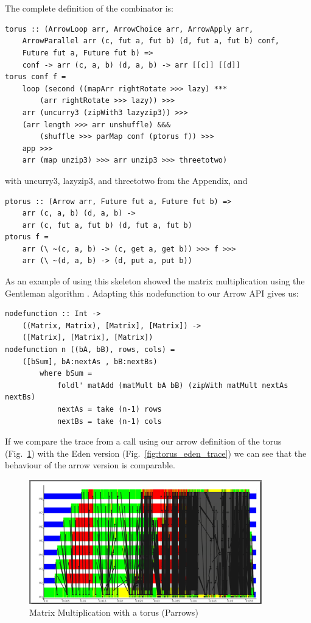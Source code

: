 \\\\
The complete definition of the  combinator is:
\begin{lstlisting}[frame=htrbl]
torus :: (ArrowLoop arr, ArrowChoice arr, ArrowApply arr,
	ArrowParallel arr (c, fut a, fut b) (d, fut a, fut b) conf,
	Future fut a, Future fut b) =>
	conf -> arr (c, a, b) (d, a, b) -> arr [[c]] [[d]]
torus conf f =
	loop (second ((mapArr rightRotate >>> lazy) ***
		(arr rightRotate >>> lazy)) >>>
	arr (uncurry3 (zipWith3 lazyzip3)) >>>
	(arr length >>> arr unshuffle) &&&
		(shuffle >>> parMap conf (ptorus f)) >>>
	app >>>
	arr (map unzip3) >>> arr unzip3 >>> threetotwo)
\end{lstlisting}
with uncurry3, lazyzip3, and threetotwo from the Appendix, and
\begin{lstlisting}[frame=htrbl]
ptorus :: (Arrow arr, Future fut a, Future fut b) =>
	arr (c, a, b) (d, a, b) ->
	arr (c, fut a, fut b) (d, fut a, fut b)
ptorus f =
	arr (\ ~(c, a, b) -> (c, get a, get b)) >>> f >>>
	arr (\ ~(d, a, b) -> (d, put a, put b))
\end{lstlisting}
As an example of using this skeleton \citet{eden_cefp} showed the matrix multiplication using the Gentleman algorithm \citep{Gentleman1978}. Adapting this nodefunction to our Arrow API gives us:
\begin{lstlisting}[frame=htrbl]
nodefunction :: Int ->
	((Matrix, Matrix), [Matrix], [Matrix]) ->
	([Matrix], [Matrix], [Matrix])
nodefunction n ((bA, bB), rows, cols) =
	([bSum], bA:nextAs , bB:nextBs)
		where bSum =
			foldl' matAdd (matMult bA bB) (zipWith matMult nextAs nextBs)
			nextAs = take (n-1) rows
			nextBs = take (n-1) cols
\end{lstlisting}
If we compare the trace from a call using our arrow definition of the torus (Fig.~\ref{fig:torus_parrows_trace}) with the Eden version (Fig.~\ref{fig:torus_eden_trace}) we can see that the behaviour of the arrow version is comparable.
\begin{figure}[ht]
	\centering
	\includegraphics[width=0.9\textwidth]{images/torus_matrix_parrows_scale}
	\caption[Matrix Multiplication with a torus (Parrows)]{Matrix Multiplication with a torus (Parrows)}
	\label{fig:torus_parrows_trace}
\end{figure}

